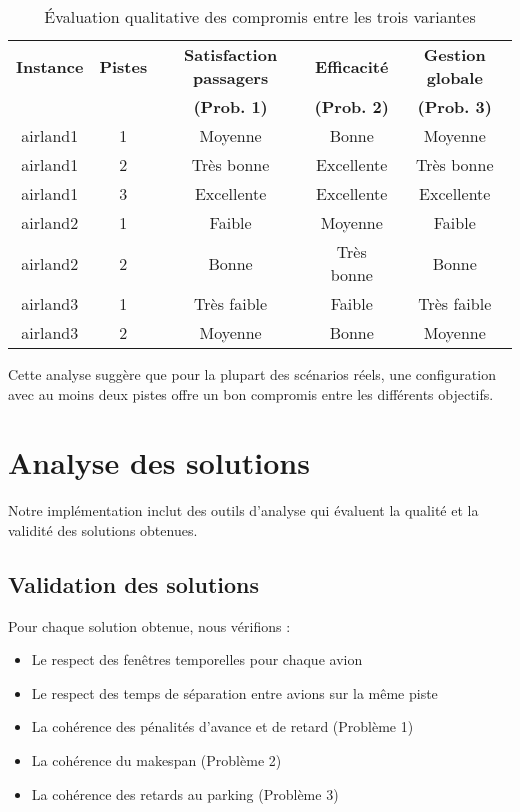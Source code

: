 \documentclass[a4paper,12pt]{report}
\begin{document}
\begin{table}[H]
  \centering
  \begin{tabular}{ccccc}
    \toprule
    \textbf{Instance} & \textbf{Pistes} & \textbf{Satisfaction passagers} & \textbf{Efficacité} & \textbf{Gestion globale} \\
    & & \textbf{(Prob. 1)} & \textbf{(Prob. 2)} & \textbf{(Prob. 3)} \\
    \midrule
    airland1 & 1 & Moyenne & Bonne & Moyenne \\
    airland1 & 2 & Très bonne & Excellente & Très bonne \\
    airland1 & 3 & Excellente & Excellente & Excellente \\
    airland2 & 1 & Faible & Moyenne & Faible \\
    airland2 & 2 & Bonne & Très bonne & Bonne \\
    airland3 & 1 & Très faible & Faible & Très faible \\
    airland3 & 2 & Moyenne & Bonne & Moyenne \\
    \bottomrule
  \end{tabular}
  \caption{Évaluation qualitative des compromis entre les trois variantes}
  \label{tab:tradeoffs}
\end{table}

Cette analyse suggère que pour la plupart des scénarios réels, une configuration avec au moins deux pistes offre un bon compromis entre les différents objectifs.

\section{Analyse des solutions}
Notre implémentation inclut des outils d'analyse qui évaluent la qualité et la validité des solutions obtenues.

\subsection{Validation des solutions}
Pour chaque solution obtenue, nous vérifions :
\begin{itemize}
  \item Le respect des fenêtres temporelles pour chaque avion
  \item Le respect des temps de séparation entre avions sur la même piste
  \item La cohérence des pénalités d'avance et de retard (Problème 1)
  \item La cohérence du makespan (Problème 2)
  \item La cohérence des retards au parking (Problème 3)
\end{itemize}
\end{document}
